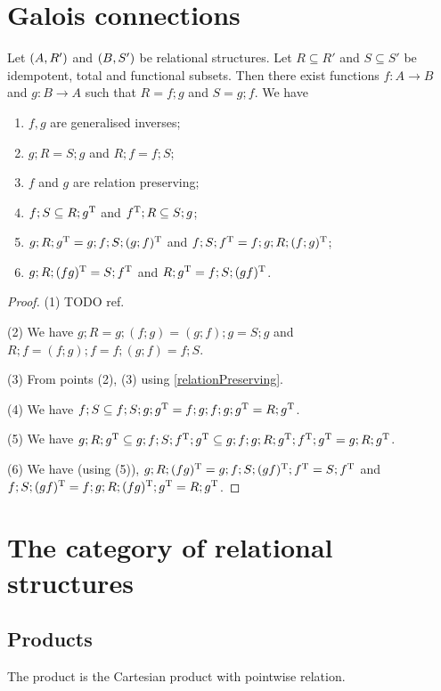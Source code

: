 \section{Galois connections}
\begin{proposition}
Let $\sSet{A,R'}$ and $\sSet{B, S'}$ be relational structures. Let $R\subseteq R'$ and $S\subseteq S'$ be idempotent, total and functional subsets. Then there exist functions $f: A\to B$ and $g: B\to A$ such that $R = f;g$ and $S = g;f$. We have
\begin{enumerate}
\item $f,g$ are generalised inverses;
\item $g;R = S;g$ and $R;f = f;S$;
\item $f$ and $g$ are relation preserving;
\item $f;S \subseteq R;g^{\mathrm{T}}$ and $f^{\mathrm{T}} ;R \subseteq S;g$;
\item $g;R;g^{\mathrm{T}} = g;f;S;(g;f)^{\mathrm{T}}$ and $f;S;f^{\mathrm{T}} = f;g;R;(f;g)^{\mathrm{T}}$;
\item $g;R;(fg)^{\mathrm{T}} = S;f^{\mathrm{T}}$ and $R;g^{\mathrm{T}} = f;S;(gf)^{\mathrm{T}}$.
\end{enumerate}
\end{proposition}
\begin{proof}
(1) TODO ref.

(2) We have $g;R = g;(f;g) = (g;f);g = S;g$ and  $R;f = (f;g);f = f;(g;f) = f;S$.

(3) From points (2), (3) using \ref{relationPreserving}.

(4) We have $f;S \subseteq f;S;g;g^{\mathrm{T}} = f;g;f;g;g^{\mathrm{T}} = R;g^{\mathrm{T}}$.

(5) We have $g;R;g^{\mathrm{T}} \subseteq g;f;S;f^{\mathrm{T}};g^{\mathrm{T}} \subseteq g;f;g;R;g^{\mathrm{T}}; f^{\mathrm{T}}; g^{\mathrm{T}} = g;R;g^{\mathrm{T}}$.

(6) We have (using (5)), $g;R;(fg)^{\mathrm{T}} = g;f;S;(gf)^{\mathrm{T}};f^{\mathrm{T}} = S;f^{\mathrm{T}}$ and $f;S;(gf)^{\mathrm{T}} = f;g;R;(fg)^{\mathrm{T}}; g^{\mathrm{T}} = R;g^{\mathrm{T}}$.
\end{proof}

\section{The category of relational structures}
\subsection{Products}
\begin{proposition}
The product is the Cartesian product with pointwise relation.
\end{proposition}

